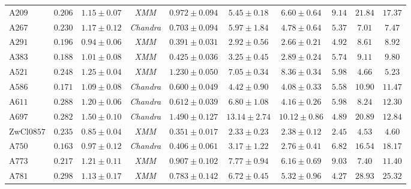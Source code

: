 \documentclass[iop, apj]{emulateapj}
\newcommand{\?}{\stackrel{?}{=}}
\begin{document}
\begin{table*}[H]
\begin{center}
\begin{tabular}{lccccccccc}
 A$209$ &$0.206$ &$1.15\pm0.07$ &{\it XMM} &$0.972\pm0.094$  &$5.45\pm0.18$ &$6.60\pm0.64$   & $9.14$ & $21.84$ & $17.37$ \\%
 A$267$ &$0.230$ &$1.17\pm0.12$ &{\it Chandra}	  &$0.703\pm0.094$  &$5.97\pm1.84$ &$4.78\pm0.64$     & $5.37$ & $7.01$  & $7.47$  \\%
 A$291$ &$0.196$ &$0.94\pm0.06$ &{\it XMM} &$0.391\pm0.031$  &$2.92\pm0.56$ &$2.66\pm0.21$   & $4.92$ & $8.61$  & $8.92$  \\%
 A$383$ &$0.188$ &$1.01\pm0.08$ &{\it XMM} &$0.425\pm0.036$   &$3.25\pm0.45$ &$2.89\pm0.24$  & $5.74$ & $9.11$  & $9.80$  \\%
 A$521$ &$0.248$ &$1.25\pm0.04$ &{\it XMM} &$1.230\pm0.050$  &$7.05\pm0.34$ &$8.36\pm0.34$   & $5.98$ & $4.66$  & $5.23$  \\%
 A$586$ &$0.171$ &$1.09\pm0.08$ &{\it Chandra}	  &$0.600\pm0.049$  &$4.42\pm0.90$ &$4.08\pm0.33$     & $5.58$ & $10.90$ & $11.47$ \\%
 A$611$ &$0.288$ &$1.20\pm0.06$ &{\it Chandra}	  &$0.612\pm0.039$  &$6.80\pm1.08$ &$4.16\pm0.26$     & $5.98$ & $8.24$  & $12.30$ \\%
 A$697$ &$0.282$ &$1.50\pm0.10$ &{\it Chandra}	  &$1.490\pm0.127$  &$13.14\pm2.74$ &$10.12\pm0.86$    & $4.89$ & $20.89$ & $12.84$ \\%
 ZwCl$0857$ &$0.235$ &$0.85\pm0.04$ &{\it XMM} &$0.351\pm0.017$ &$2.33\pm0.23$ &$2.38\pm0.12$ & $2.45$ & $4.53$  & $4.60$  \\%
 A$750$ &$0.163$ &$0.97\pm0.12$ &{\it Chandra}	  &$0.406\pm0.061$  &$3.17\pm1.22$ &$2.76\pm0.41$     & $6.82$ & $16.54$ & $18.17$ \\%
 A$773$ &$0.217$ &$1.21\pm0.11$ &{\it XMM} &$0.907\pm0.102$  &$7.77\pm0.94$ &$6.16\pm0.69$   & $9.03$ & $7.40$  & $11.40$  \\%
 A$781$ &$0.298$ &$1.13\pm0.17$ &{\it XMM} &$0.783\pm0.142$  &$6.72\pm0.45$ &$5.32\pm0.96$   & $4.27$ & $28.93$ & $25.32$ \\%

\end{tabular}
\end{center}
\end{table*}
\end{document}
